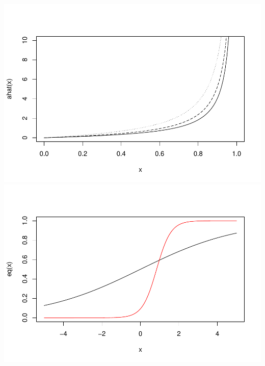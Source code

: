 \documentclass[
  english,
  man,floatsintext]{apa6}
\begin{document}
\includegraphics{papaja-test_files/figure-latex/unnamed-chunk-3-1.pdf}
\includegraphics{papaja-test_files/figure-latex/unnamed-chunk-4-1.pdf}
\end{document}
